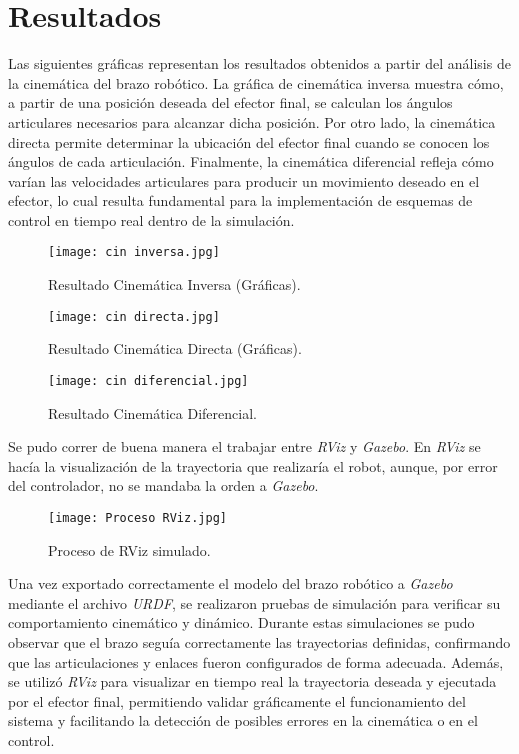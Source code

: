 \chapter{Resultados} \label{chap:resultados}


Las siguientes gráficas representan los resultados obtenidos a partir del análisis de la cinemática del brazo robótico. La gráfica de cinemática inversa muestra cómo, a partir de una posición deseada del efector final, se calculan los ángulos articulares necesarios para alcanzar dicha posición. Por otro lado, la cinemática directa permite determinar la ubicación del efector final cuando se conocen los ángulos de cada articulación. Finalmente, la cinemática diferencial refleja cómo varían las velocidades articulares para producir un movimiento deseado en el efector, lo cual resulta fundamental para la implementación de esquemas de control en tiempo real dentro de la simulación.

\begin{figure}[H]
	\centering
	\texttt{[image: cin inversa.jpg]}
	\caption{Resultado Cinemática Inversa (Gráficas).}
	\label{fig:CINEMÁTICA INVERSA}
\end{figure}

\begin{figure}[H]
	\centering
	\texttt{[image: cin directa.jpg]}
	\caption{Resultado Cinemática Directa (Gráficas).}
	\label{fig:CINEMÁTICA DIRECTA}
\end{figure}

\begin{figure}[H]
	\centering
	\texttt{[image: cin diferencial.jpg]}
	\caption{Resultado Cinemática Diferencial.}
	\label{fig:CINEMÁTICA DIFERENCIAL}
\end{figure}


	Se pudo correr de buena manera el trabajar entre \textit{RViz} y \textit{Gazebo}. En \textit{RViz} se hacía la visualización de la trayectoria que realizaría el robot, aunque, por error del controlador, no se mandaba la orden a \textit{Gazebo}.



\begin{figure}[H]
	\centering
	\texttt{[image: Proceso RViz.jpg]}
	\caption{Proceso de RViz simulado.}
	\label{fig:RViz proceso}
\end{figure}



	Una vez exportado correctamente el modelo del brazo robótico a \textit{Gazebo} mediante el archivo \textit{URDF}, se realizaron pruebas de simulación para verificar su comportamiento cinemático y dinámico. Durante estas simulaciones se pudo observar que el brazo seguía correctamente las trayectorias definidas, confirmando que las articulaciones y enlaces fueron configurados de forma adecuada. Además, se utilizó \textit{RViz} para visualizar en tiempo real la trayectoria deseada y ejecutada por el efector final, permitiendo validar gráficamente el funcionamiento del sistema y facilitando la detección de posibles errores en la cinemática o en el control.


